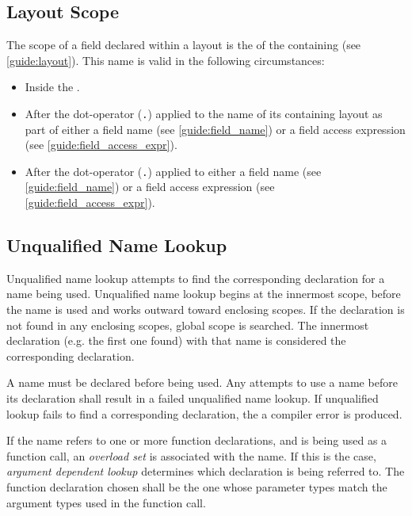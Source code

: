 \subsection{Layout Scope} \label{guide:layout_scope}

The scope of a field declared within a layout is the  of the containing  (see \ref{guide:layout}). This name is valid in the following circumstances:

\begin{itemize}
\item Inside the .

\item After the dot-operator (\texttt{.}) applied to the name of its containing layout as part of either a field name (see \ref{guide:field_name}) or a field access expression (see \ref{guide:field_access_expr}).

\item After the dot-operator (\texttt{.}) applied to either a field name (see \ref{guide:field_name}) or a field access expression (see \ref{guide:field_access_expr}).
\end{itemize}

\subsection{Unqualified Name Lookup} \label{guide:unqlfd_lookup}

Unqualified name lookup attempts to find the corresponding declaration for a name being used. Unqualified name lookup begins at the innermost scope, before the name is used and works outward toward enclosing scopes. If the declaration is not found in any enclosing scopes, global scope is searched. The innermost declaration (e.g. the first one found) with that name is considered the corresponding declaration.

A name must be declared before being used. Any attempts to use a name before its declaration shall result in a failed unqualified name lookup. If unqualified lookup fails to find a corresponding declaration, the a compiler error is produced.

If the name refers to one or more function declarations, and is being used as a function call, an \textit{overload set} is associated with the name. If this is the case, \textit{argument dependent lookup} determines which declaration is being referred to. The function declaration chosen shall be the one whose parameter types match the argument types used in the function call.

